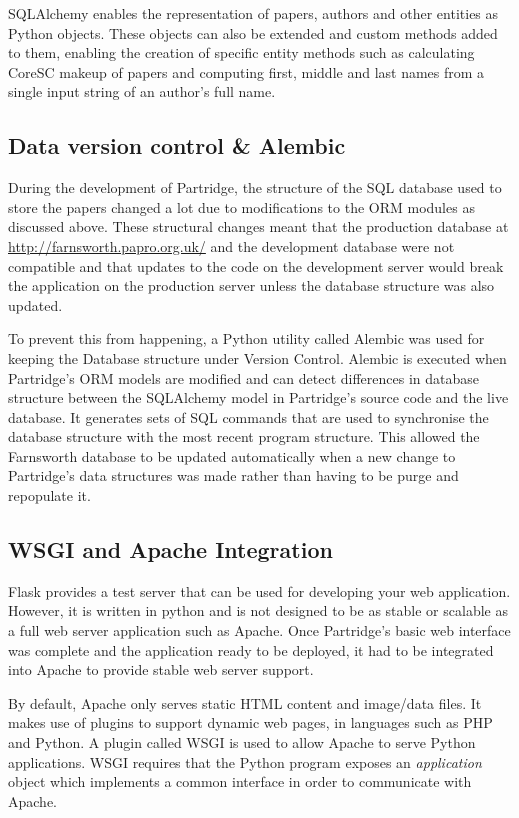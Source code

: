 SQLAlchemy enables the representation of papers, authors and other entities as
Python objects. These objects can also be extended and custom methods added to
them, enabling the creation of specific entity methods such as calculating
CoreSC makeup of papers and computing first, middle and last names from a
single input string of an author's full name.

\subsection{Data version control \& Alembic}

During the development of Partridge, the structure of the SQL database used to
store the papers changed a lot due to modifications to the ORM modules as
discussed above. These structural changes meant that the production database at
\url{http://farnsworth.papro.org.uk/} and the development database were not
compatible and that updates to the code on the development server would break
the application on the production server unless the database structure was also
updated. 

To prevent this from happening, a Python utility called
Alembic\cite{alembic2013} was used for keeping the Database structure under
Version Control. Alembic is executed when Partridge's ORM models are modified
and can detect differences in database structure between the SQLAlchemy model
in Partridge's source code and the live database. It generates sets of SQL
commands that are used to synchronise the database structure with the most
recent program structure. This allowed the Farnsworth database to be updated
automatically when a new change to Partridge's data structures was made rather
than having to be purge and repopulate it.

\subsection{WSGI and Apache Integration}

Flask provides a test server that can be used for developing your web
application. However, it is written in python and is not designed to be as
stable or scalable as a full web server application such as Apache. Once
Partridge's basic web interface was complete and the application ready to be
deployed, it had to be integrated into Apache to provide stable web server
support.

By default, Apache only serves static HTML content and image/data files. It makes
use of plugins to support dynamic web pages, in languages such as PHP and
Python. A plugin called WSGI is used to allow Apache to serve Python
applications. WSGI requires that the Python program exposes an
\emph{application} object which implements a common interface in order to
communicate with Apache.

